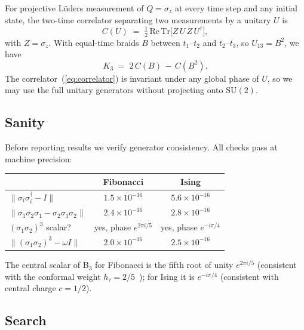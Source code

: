 \documentclass[aps,prx,reprint,amsmath,amssymb,floatfix,nofootinbib,superscriptaddress]{revtex4-2}
\begin{document}
For projective L\"uders measurement of $Q=\sigma_{z}$ at every time
step and any initial state, the two-time correlator separating two
measurements by a unitary $U$ is
\begin{equation}
  C(U) \;=\; \tfrac{1}{2}\,\mathrm{Re}\,\mathrm{Tr}\bigl[Z\,U\,Z\,U^{\dagger}\bigr],
\label{eq:correlator}
\end{equation}
with $Z=\sigma_{z}$. With equal-time braids $B$ between $t_{1}$--$t_{2}$
and $t_{2}$--$t_{3}$, so $U_{13}=B^{2}$, we have
\begin{equation}
  K_{3} \;=\; 2\,C(B) \,-\, C(B^{2}).
\end{equation}
The correlator~(\ref{eq:correlator}) is invariant under any global
phase of $U$, so we may use the full unitary generators without
projecting onto $\mathrm{SU}(2)$.

\subsection{Sanity}

Before reporting results we verify generator consistency. All checks
pass at machine precision:
\begin{center}\small
\begin{tabular}{lcc}
\toprule
& Fibonacci & Ising \\
\midrule
$\|\sigma_{i}\sigma_{i}^{\dagger}-I\|$ & $1.5\times10^{-16}$ & $5.6\times10^{-16}$ \\
$\|\sigma_{1}\sigma_{2}\sigma_{1}-\sigma_{2}\sigma_{1}\sigma_{2}\|$
                                      & $2.4\times10^{-16}$ & $2.8\times10^{-16}$ \\
$(\sigma_{1}\sigma_{2})^{3}$ scalar?  & yes, phase $e^{2\pi i/5}$
                                      & yes, phase $e^{-i\pi/4}$ \\
$\|(\sigma_{1}\sigma_{2})^{3}-\omega I\|$
                                      & $2.0\times10^{-16}$ & $2.5\times10^{-16}$ \\
\bottomrule
\end{tabular}
\end{center}
The central scalar of B$_{3}$ for Fibonacci is the fifth root of unity
$e^{2\pi i/5}$ (consistent with the conformal weight
$h_{\tau} = 2/5$~\cite{NayakSimonStern2008}); for Ising it is
$e^{-i\pi/4}$ (consistent with central charge $c=1/2$).

\subsection{Search}
\end{document}
